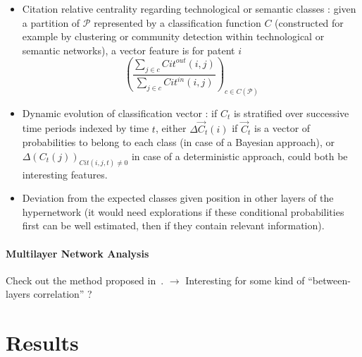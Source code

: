 \begin{itemize}
\item Citation relative centrality regarding technological or semantic classes : given a partition of $\mathcal{P}$ represented by a classification function $C$ (constructed for example by clustering or community detection within technological or semantic networks), a vector feature is for patent $i$
\[
\left(\frac{\sum_{j\in c}Cit^{out}(i,j)}{\sum_{j\in c}Cit^{in}(i,j)}\right)_{c\in C(\mathcal{P})}
\]
\item Dynamic evolution of classification vector : if $C_t$ is stratified over successive time periods indexed by time $t$, either $\Delta \vec{C}_t (i)$ if $\vec{C}_t$ is a vector of probabilities to belong to each class (in case of a Bayesian approach), or $\Delta (C_t(j))_{Cit(i,j,t)\neq 0}$ in case of a deterministic approach, could both be interesting features.
\item Deviation from the expected classes given position in other layers of the hypernetwork (it would need explorations if these conditional probabilities first can be well estimated, then if they contain relevant information).
\end{itemize}






\paragraph{Multilayer Network Analysis}
Check out the method proposed in~\cite{iacovacci2015mesoscopic}. $\rightarrow$ Interesting for some kind of ``between-layers correlation'' ?








\section{Results}

















